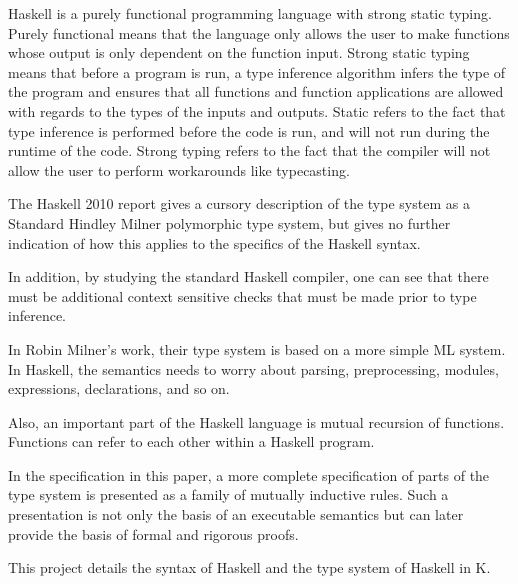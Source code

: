 Haskell is a purely functional programming language with strong static typing. Purely functional means that the language only allows the user to make functions whose output is only dependent on the function input. Strong static typing means that before a program is run, a type inference algorithm infers the type of the program and ensures that all functions and function applications are allowed with regards to the types of the inputs and outputs. Static refers to the fact that type inference is performed before the code is run, and will not run during the runtime of the code. Strong typing refers to the fact that the compiler will not allow the user to perform workarounds like typecasting.

The Haskell 2010 report gives a cursory description of the type system as a Standard Hindley Milner polymorphic type system, but gives no further indication of how this applies to the specifics of the Haskell syntax.

In addition, by studying the standard Haskell compiler, one can see that there must be additional context sensitive checks that must be made prior to type inference.

In Robin Milner's work, their type system is based on a more simple ML system. In Haskell, the semantics needs to worry about parsing, preprocessing, modules, expressions, declarations, and so on.

Also, an important part of the Haskell language is mutual recursion of functions. Functions can refer to each other within a Haskell program.

In the specification in this paper, a more complete specification of parts of the type system is presented as a family of mutually inductive rules. Such a presentation is not only the basis of an executable semantics but can later provide the basis of formal and rigorous proofs.

This project details the syntax of Haskell and the type system of Haskell in K.